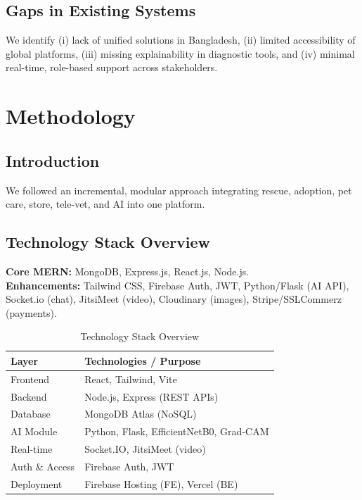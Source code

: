 \documentclass[12pt,a4paper]{report}
\numberwithin{figure}{chapter}
\numberwithin{table}{chapter}
\begin{document}
\section{Gaps in Existing Systems}
We identify (i) lack of unified solutions in Bangladesh, (ii) limited accessibility of global platforms, (iii) missing explainability in diagnostic tools, and (iv) minimal real-time, role-based support across stakeholders.

\chapter{Methodology}\label{chap:method}

\section{Introduction}
We followed an incremental, modular approach integrating rescue, adoption, pet care, store, tele-vet, and AI into one platform.

\section{Technology Stack Overview}
\textbf{Core MERN:} MongoDB, Express.js, React.js, Node.js. \\
\textbf{Enhancements:} Tailwind CSS, Firebase Auth, JWT, Python/Flask (AI API), Socket.io (chat), JitsiMeet (video), Cloudinary (images), Stripe/SSLCommerz (payments).

\begin{table}[H]
\centering
\caption{Technology Stack Overview}
\begin{tabular}{ll}
\toprule
Layer & Technologies / Purpose \\
\midrule
Frontend & React, Tailwind, Vite \\
Backend & Node.js, Express (REST APIs) \\
Database & MongoDB Atlas (NoSQL) \\
AI Module & Python, Flask, EfficientNetB0, Grad-CAM \\
Real-time & Socket.IO, JitsiMeet (video) \\
Auth \& Access & Firebase Auth, JWT \\
Deployment & Firebase Hosting (FE), Vercel (BE) \\
\bottomrule
\end{tabular}
\end{table}
\end{document}
